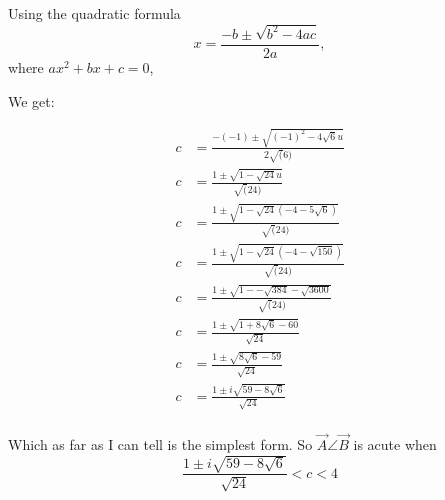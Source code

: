 \documentclass[main.tex]{subfiles}
\begin{document}
Using the quadratic formula \[x = \frac{-b \pm \sqrt{b^2 - 4ac}}{2a},\]
 where $ax^2 + bx + c =0$,

We get:

\begin{align*}
c &= \frac{-(-1) \pm \sqrt{(-1)^2 - 4\sqrt{6}u}}{2\sqrt(6)}\\
c &= \frac{1 \pm \sqrt{1 - \sqrt{24}u}}{\sqrt(24)}\\
c &= \frac{1 \pm \sqrt{1 - \sqrt{24}(-4-5\sqrt{6})}}{\sqrt(24)}\\
c &= \frac{1 \pm \sqrt{1 - \sqrt{24}(-4-\sqrt{150})}}{\sqrt(24)}\\
c &= \frac{1 \pm \sqrt{1 - -\sqrt{384}-\sqrt{3600}}}{\sqrt(24)}\\
c &= \frac{1 \pm \sqrt{1 + 8\sqrt{6}-60}}{\sqrt{24}}\\
c &= \frac{1 \pm \sqrt{ 8\sqrt{6}-59}}{\sqrt{24}}\\
c &= \frac{1 \pm i\sqrt{ 59- 8\sqrt{6}}}{\sqrt{24}}\\
\end{align*}

Which as far as I can tell is the simplest form.
So $\vec{A}\angle\vec{B}$ is acute when \[
\frac{1 \pm i\sqrt{ 59- 8\sqrt{6}}}{\sqrt{24}} < c < 4\]
\end{document}
